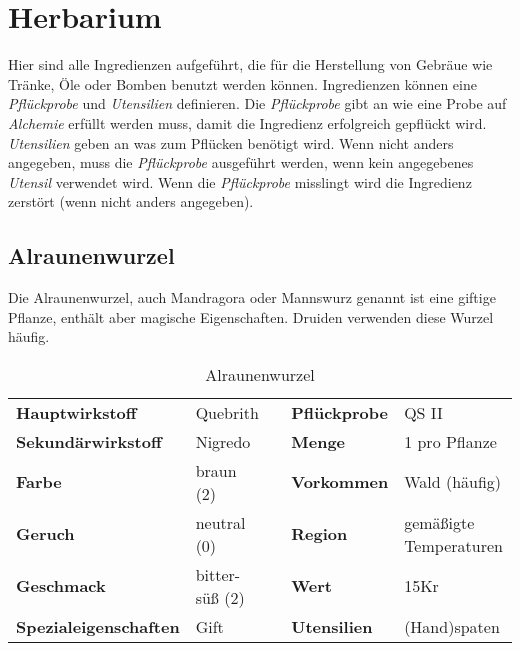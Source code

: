 \section{Herbarium}
Hier sind alle Ingredienzen aufgeführt, die für die Herstellung von Gebräue wie Tränke, Öle oder Bomben benutzt werden können. Ingredienzen können eine \textit{Pflückprobe} und \textit{Utensilien} definieren. Die \textit{Pflückprobe} gibt an wie eine Probe auf \textit{Alchemie} erfüllt werden muss, damit die Ingredienz erfolgreich gepflückt wird. \textit{Utensilien} geben an was zum Pflücken benötigt wird. Wenn nicht anders angegeben, muss die \textit{Pflückprobe} ausgeführt werden, wenn kein angegebenes \textit{Utensil} verwendet wird. Wenn die \textit{Pflückprobe} misslingt wird die Ingredienz zerstört (wenn nicht anders angegeben).

\subsection{Alraunenwurzel}

Die Alraunenwurzel, auch Mandragora oder Mannswurz genannt ist eine giftige Pflanze, enthält aber magische Eigenschaften. Druiden verwenden diese Wurzel häufig.

\begin{table}[h]
\begin{center}
\begin{tabular}{|l|l|p{1cm}|l|l|}
	\cline{1-2} \cline{4-5}
	\textbf{Hauptwirkstoff} & Quebrith && \textbf{Pflückprobe} & QS II \\ \cline{1-2} \cline{4-5}
	\textbf{Sekundärwirkstoff} & Nigredo && \textbf{Menge} & 1 pro Pflanze \\ \cline{1-2} \cline{4-5}
	\textbf{Farbe} & braun (2) && \textbf{Vorkommen} & Wald (häufig) \\ \cline{1-2} \cline{4-5}
	\textbf{Geruch} & neutral (0) && \textbf{Region} & gemäßigte Temperaturen \\ \cline{1-2} \cline{4-5}
	\textbf{Geschmack} & bitter-süß (2) && \textbf{Wert} & 15Kr \\ \cline{1-2} \cline{4-5}
	\textbf{Spezialeigenschaften} & Gift && \textbf{Utensilien} & (Hand)spaten \\ \cline{1-2} \cline{4-5}
\end{tabular}
\end{center}
\caption{Alraunenwurzel}
\label{tab:alraunenwurzel}
\end{table}

